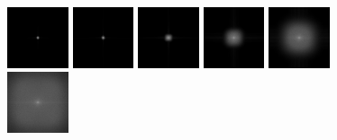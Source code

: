 \begin{figure}[!h]
\includegraphics[width=0.16\textwidth]{img/ch6/dirty/fft1.png}
\includegraphics[width=0.16\textwidth]{img/ch6/dirty/fft2.png}
\includegraphics[width=0.16\textwidth]{img/ch6/dirty/fft3.png}
\includegraphics[width=0.16\textwidth]{img/ch6/dirty/fft4.png}
\includegraphics[width=0.16\textwidth]{img/ch6/dirty/fft5.png}
\includegraphics[width=0.16\textwidth]{img/ch6/dirty/fft6.png}


\end{figure}
